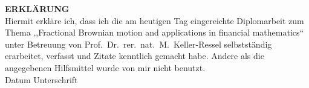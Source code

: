\documentclass[a4paper, twoside, 11pt]{article}
\theoremstyle{definition}
\begin{document}
\newpage
\thispagestyle{empty}
\Large
\textbf{ERKL\"ARUNG} \\[1em]
\large
Hiermit erkl\"are ich, dass ich die am heutigen Tag eingereichte Diplomarbeit zum Thema ,,Fractional Brownian motion and applications in financial mathematics`` unter Betreuung von Prof.\ Dr.\ rer.\ nat.\ M.\ Keller-Ressel selbstst\"andig erarbeitet, verfasst und Zitate kenntlich gemacht habe. Andere als die angegebenen Hilfsmittel wurde von mir nicht benutzt. \\[5em]
\vspace{2cm}
\large
Datum \hfill Unterschrift 
\end{document}
